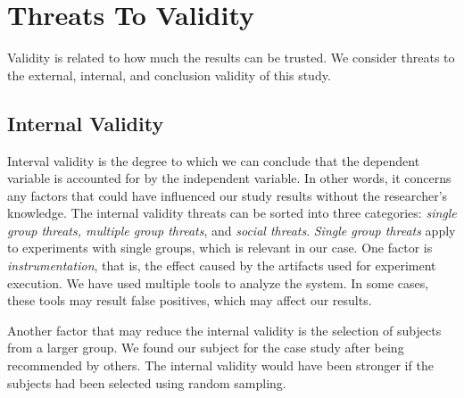 







\section{Threats To Validity}
\label{sub:threats_to_validity}
Validity is related to how much the results can be trusted\cite{Wohlin:2000:ESE:330775}. We consider threats to the external, internal, and conclusion validity of this study.


\subsection{Internal Validity}
\label{sub:internal_validty}
Interval validity is the degree to which we can conclude that the dependent variable is accounted for by the independent variable\cite{Wohlin:2000:ESE:330775}. In other words, it concerns any factors that could have influenced our study results without the researcher's knowledge. The internal validity threats can be sorted into three categories\cite{Wohlin:2000:ESE:330775}: \textit{single group threats, multiple group threats}, and \textit{social threats}. \textit{Single group threats} apply to experiments with single groups, which is relevant in our case. One factor is \textit{instrumentation}, that is, the effect caused by the artifacts used for experiment execution\cite{Wohlin:2000:ESE:330775}. We have used multiple tools to analyze the system. In some cases, these tools may result false positives, which may affect our results.

Another factor that may reduce the internal validity is the selection of subjects from a larger group\cite{Wohlin:2000:ESE:330775}. We found our subject for the case study after being recommended by others. The internal validity would have been stronger if the subjects had been selected using random sampling.


